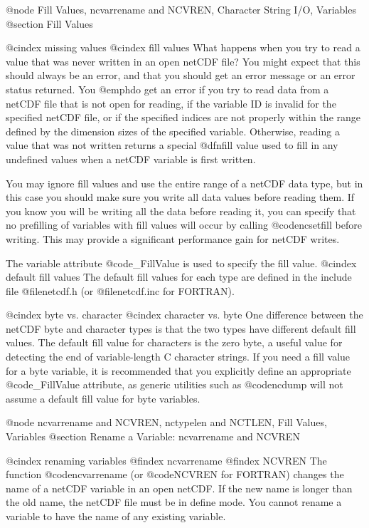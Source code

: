 @node Fill Values, ncvarrename and NCVREN, Character String I/O, Variables
@section Fill Values

@cindex missing values
@cindex fill values
What happens when you try to read a value that was never written in an
open netCDF file?  You might expect that this should always be an error,
and that you should get an error message or an error status returned.
You @emph{do} get an error if you try to read data from a netCDF file
that is not open for reading, if the variable ID is invalid for the
specified netCDF file, or if the specified indices are not properly
within the range defined by the dimension sizes of the specified
variable.  Otherwise, reading a value that was not written returns a
special @dfn{fill value} used to fill in any undefined values when a
netCDF variable is first written.

You may ignore fill values and use the entire range of a netCDF
data type, but in this case you should make sure you write all data
values before reading them.  If you know you will be writing all
the data before reading it, you can specify that no prefilling of
variables with fill values will occur by calling @code{ncsetfill}
before writing.  This may provide a significant performance gain for
netCDF writes.

The variable attribute @code{_FillValue} is used to specify the fill value.
@cindex default fill values
The default fill values for each type are defined in the include file
@file{netcdf.h} (or @file{netcdf.inc} for FORTRAN).

@cindex byte vs. character
@cindex character vs. byte
One difference between the netCDF byte and character
types is that the two types have different default fill values.
The default fill value for characters
is the zero byte, a useful value for detecting the end of
variable-length C character strings.  If you need a fill value for a
byte variable, it is recommended that you explicitly define an
appropriate @code{_FillValue} attribute, as generic utilities such as
@code{ncdump} will not assume a default fill value for byte variables.

@node ncvarrename and NCVREN, nctypelen and NCTLEN, Fill Values, Variables
@section Rename a Variable:  ncvarrename and NCVREN

@cindex renaming variables
@findex ncvarrename
@findex NCVREN
The function @code{ncvarrename} (or @code{NCVREN} for FORTRAN) changes
the name of a netCDF variable in an open netCDF.  If the new name is
longer than the old name, the netCDF file must be in define mode.  You cannot
rename a variable to have the name of any existing variable.

